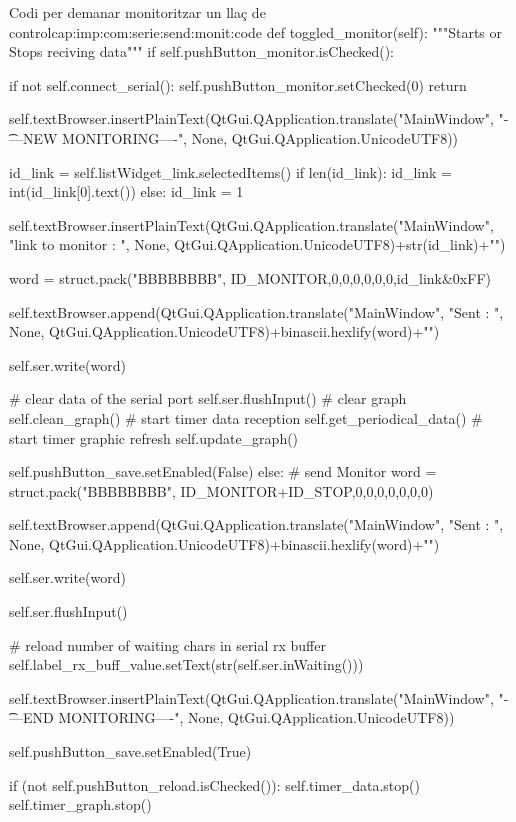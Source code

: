 \begin{code_python}{Codi per demanar monitoritzar un llaç de control}{cap:imp:com:serie:send:monit:code}
def toggled_monitor(self):
	"""Starts or Stops reciving data"""
	if self.pushButton_monitor.isChecked():
		
		if not self.connect_serial():
		    self.pushButton_monitor.setChecked(0)
		    return
		
		self.textBrowser.insertPlainText(QtGui.QApplication.translate("MainWindow", "\n\t----NEW MONITORING----\n", None, QtGui.QApplication.UnicodeUTF8))
		
		id_link = self.listWidget_link.selectedItems()
		if len(id_link):
		    id_link = int(id_link[0].text())
		else:
		    id_link = 1
		
		self.textBrowser.insertPlainText(QtGui.QApplication.translate("MainWindow", "link to monitor : ", None, QtGui.QApplication.UnicodeUTF8)+str(id_link)+"\n")
		
		word = struct.pack("BBBBBBBB", ID_MONITOR,0,0,0,0,0,0,id_link&0xFF)

		self.textBrowser.append(QtGui.QApplication.translate("MainWindow", "Sent : ", None, QtGui.QApplication.UnicodeUTF8)+binascii.hexlify(word)+"\n")

		self.ser.write(word)
		 
		# clear data of the serial port
		self.ser.flushInput()
		# clear graph
		self.clean_graph()
		# start timer data reception
		self.get_periodical_data()
		# start timer graphic refresh
		self.update_graph()
		
		self.pushButton_save.setEnabled(False)
	else:
		# send Monitor
		word = struct.pack("BBBBBBBB", ID_MONITOR+ID_STOP,0,0,0,0,0,0,0)

		self.textBrowser.append(QtGui.QApplication.translate("MainWindow", "Sent : ", None, QtGui.QApplication.UnicodeUTF8)+binascii.hexlify(word)+"\n")

		self.ser.write(word)
		
		self.ser.flushInput()
		
		# reload number of waiting chars in serial rx buffer
		self.label_rx_buff_value.setText(str(self.ser.inWaiting()))
		
		self.textBrowser.insertPlainText(QtGui.QApplication.translate("MainWindow", "\n\t----END MONITORING----\n", None, QtGui.QApplication.UnicodeUTF8))
		
		self.pushButton_save.setEnabled(True)
		
		if (not self.pushButton_reload.isChecked()):
		    self.timer_data.stop()
		self.timer_graph.stop()
\end{code_python}


